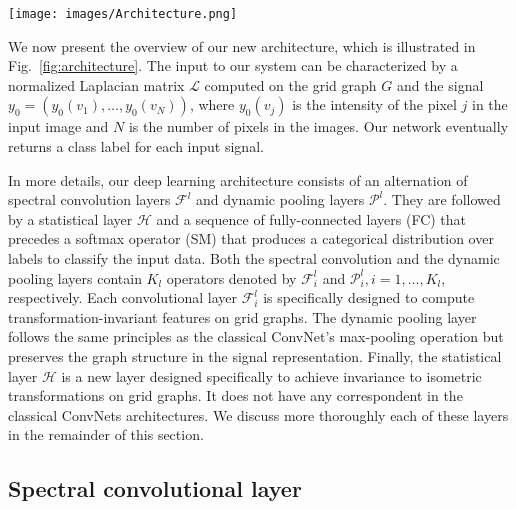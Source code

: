 \documentclass[10pt,journal,compsoc]{IEEEtran}
\begin{document}
	\begin{figure*}[tb!]
		\texttt{[image: images/Architecture.png]}
		\vspace{-1.0cm}
		\caption{{\bf TIGraNet} architecture. The network is composed of an alternation of spectral convolution layers $\mathcal{F}^{l}$  and dynamic pooling layers $\mathcal{P}^{l}$, followed by a statistical layer $\mathcal{H}$, multiple fully-connected layers (FC) and a softmax operator (SM). The input of the network is an image that is represented as a signal $y_0$ on the grid-graph with Laplacian matrix $\mathcal{L}$. The output of the system is a label that corresponds to the most likely class for the input sample.}
		\label{fig:architecture}
	\end{figure*}

	We now present the overview of our new architecture, which is illustrated in Fig.~\ref{fig:architecture}. The input to our system can be characterized by a normalized Laplacian matrix $\mathcal{L}$ computed on the grid graph $G$ and the signal $y_0 = (y_0(v_1), \dots, y_0(v_N))$, where $y_0(v_j)$ is the intensity of the pixel $j$ in the input image and $N$ is the number of pixels in the images. Our network eventually returns a class label for each input signal.

	In more details, our deep learning architecture consists of an alternation of spectral convolution layers $\mathcal{F}^{l}$ and dynamic pooling layers $\mathcal{P}^{l}$. They are followed by a statistical layer $\mathcal{H}$ and a sequence of fully-connected layers (FC) that precedes a softmax operator (SM) that produces a categorical distribution over labels to classify the input data. Both the spectral convolution and the dynamic pooling layers contain $K_l$ operators denoted by $\mathcal{F}_i^{l}$ and $\mathcal{P}_i^{l}, i=1,\dots,K_l$, respectively.  Each convolutional layer $\mathcal{F}_i^{l}$ is specifically designed to compute transformation-invariant features on grid graphs. The dynamic pooling layer follows the same principles as the classical ConvNet's max-pooling operation but preserves the graph structure in the signal representation. Finally, the statistical layer $\mathcal{H}$ is a new layer designed specifically to achieve invariance to isometric transformations on grid graphs. It does not have any correspondent in the classical ConvNets architectures. We discuss more thoroughly each of these layers in the remainder of this section.

	\subsection{Spectral convolutional layer}
	\label{s:conv}
\end{document}
